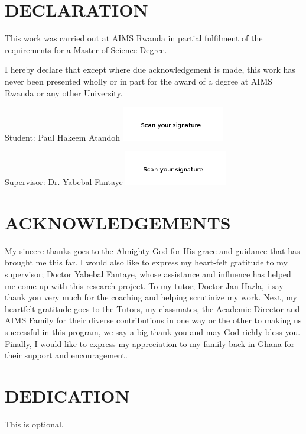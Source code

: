 \chapter*{DECLARATION}
This work was carried out at AIMS Rwanda in partial fulfilment of the requirements for a Master of Science Degree.

I hereby declare that except where due acknowledgement is made, this work has never been presented wholly or in part for the award of a degree at AIMS Rwanda or any other University.

\vspace{1.5cm}
Student: Paul Hakeem Atandoh \includegraphics[height=1.5cm]{images/signature.png}

\vspace{1.5cm}

Supervisor: Dr. Yabebal  Fantaye \includegraphics[height=1.5cm]{images/signature1.png}


\newpage

\chapter*{ACKNOWLEDGEMENTS}
My sincere thanks goes to the Almighty God for His grace and guidance that has brought me this far. I would also like to express my heart-felt gratitude to my supervisor; Doctor Yabebal Fantaye, whose assistance and influence has helped me come up with this research project.
To my tutor; Doctor Jan Hazla, i say thank you very much for the coaching and helping scrutinize my work. Next, my heartfelt gratitude goes to the Tutors, my classmates, the Academic Director and AIMS Family for their diverse contributions in one way or the other to making us successful in this program, we say a big thank you and may God richly bless you.
Finally, I would like to express my appreciation to my family back in Ghana for their support and encouragement.
\newpage
\chapter*{DEDICATION} 

This is optional.